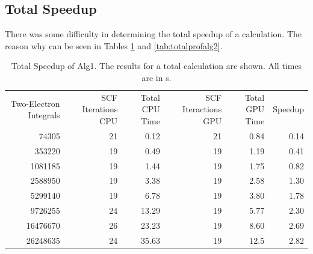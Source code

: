 \documentclass[12pt]{report}
\begin{document}
\subsection{Total Speedup}
There was some difficulty in determining the total speedup of a calculation. The reason why can be seen in Tables \ref{tab:totalprofalg1} and \ref{tab:totalprofalg2}.

\begin{table}[h!]
\begin{center}
\caption[Total Speedup of Alg1]{Total Speedup of Alg1. The results for a total calculation are shown. All times are in s.}
\label{tab:totalprofalg1}
\begin{tabular}{rrrrrr}
\toprule
	\multirow{2}{3cm}{Two-Electron Integrals}	&	\multirow{2}{3cm}{SCF Iterations CPU}	&	\multirow{2}{2cm}{Total CPU Time}		&	\multirow{2}{3cm}{SCF Iteractions GPU}		&	\multirow{2}{2cm}{Total GPU Time}		&	\multirow{2}{*}{Speedup}	\\
	\\
\midrule
	74305	&	21	&	0.12		&	21	&	0.84	&	0.14	\\
	353220	&	19	&	0.49		&	19	&	1.19	&	0.41	\\
	1081185	&	19	&	1.44		&	19	&	1.75	&	0.82	\\
	2588950	&	19	&	3.38		&	19	&	2.58	&	1.30	\\
	5299140	&	19	&	6.78		&	19	&	3.80	&	1.78	\\
	9726255	&	24	&	13.29	&	19	&	5.77	&	2.30	\\
	16476670	&	26	&	23.23	&	19	&	8.60	&	2.69	\\
	26248635	&	24	&	35.63	&	19	&	12.5	&	2.82	\\
\bottomrule
\end{tabular}
\end{center}
\end{table}
\end{document}
